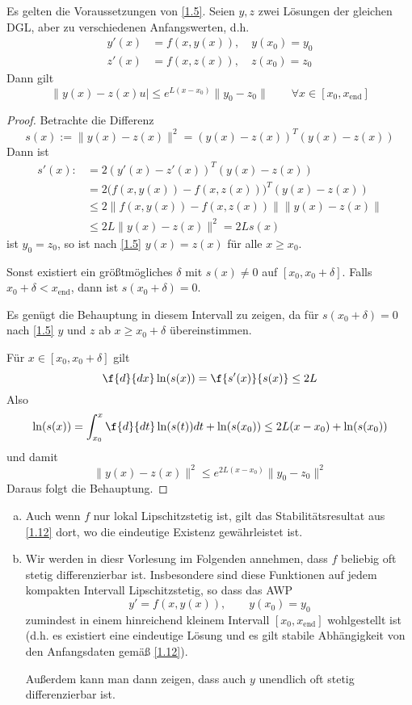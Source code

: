 \documentclass[
]{mycourse}
\begin{document}
\begin{st} \label{1.12}
	Es gelten die Voraussetzungen von \ref{1.5}.
	Seien $y,z$ zwei Lösungen der gleichen DGL, aber zu verschiedenen Anfangswerten, d.h.
	\begin{align*}
		y'(x) &= f(x,y(x)), \quad y(x_0) = y_0 \\
		z'(x) &= f(x,z(x)), \quad z(x_0) = z_0
	\end{align*}
	Dann gilt
	\[
		\|y(x) - z(x)u| \le e^{L(x-x_0)} \|y_0 - z_0\|
		\qquad \forall x \in [x_0,x_{\text{end}}]
	\]
	\begin{proof}
		Betrachte die Differenz
		\[
			s(x) := \|y(x) - z(x)\|^2 = (y(x)-z(x))^T (y(x) - z(x))
		\]
		Dann ist
		\begin{align*}
			s'(x) :&= 2(y'(x)-z'(x))^T (y(x)-z(x)) \\
			&= 2 \Big( f(x,y(x)) - f(x,z(x)) \Big)^T (y(x) -z(x)) \\ 
			&\le 2 \Big\| f(x,y(x)) - f(x, z(x)) \Big\| \| y(x) -z(x)\| \\
			&\le 2 L \|y(x) - z(x) \|^2 
			= 2 Ls(x)
		\end{align*}
		ist $y_0 = z_0$, so ist nach \ref{1.5} $y(x) = z(x)$ für alle $x \ge x_0$.

		Sonst existiert ein größtmögliches $\delta$ mit $s(x) \neq 0$ auf $[x_0,x_0 + \delta]$.
		Falls $x_0 + \delta < x_{\text{end}}$, dann ist $s(x_0 + \delta) = 0$.

		Es genügt die Behauptung in diesem Intervall zu zeigen, da für $s(x_0 + \delta) = 0$ nach \ref{1.5} $y$ und $z$ ab $x \ge x_0 + \delta$ übereinstimmen.

		Für $x \in [x_0, x_0 + \delta]$ gilt
		\[
			\f{d}{dx} \ln (s(x)) = \f {s'(x)}{s(x)} \le 2L
		\]
		Also
		\[
			\ln (s(x))  
			= \int_{x_0}^x \f {d}{dt} \ln(s(t)) dt + \ln(s(x_0))
			\le 2 L (x-x_0) + \ln (s(x_0))
		\]
		und damit
		\[
			\|y(x) - z(x)\|^2 \le e^{2L(x-x_0)} \|y_0-z_0\|^2
		\]
		Daraus folgt die Behauptung.
	\end{proof}
\end{st}


\begin{nt} \label{1.13}
	\begin{enumerate}[a)]
		\item
			Auch wenn $f$ nur lokal Lipschitzstetig ist, gilt das Stabilitätsresultat aus \ref{1.12} dort, wo die eindeutige Existenz gewährleistet ist.
		\item
			Wir werden in diesr Vorlesung im Folgenden annehmen, dass $f$ beliebig oft stetig differenzierbar ist.
			Insbesondere sind diese Funktionen auf jedem kompakten Intervall Lipschitzstetig, so dass das AWP 
			\[
				y'=f(x,y(x)), \qquad y(x_0) = y_0
			\]
			zumindest in einem hinreichend kleinem Intervall $[x_0, x_{\text{end}}]$ wohlgestellt ist (d.h. es existiert eine eindeutige Lösung und es gilt stabile Abhängigkeit von den Anfangsdaten gemäß \ref{1.12}).

			Außerdem kann man dann zeigen, dass auch $y$ unendlich oft stetig differenzierbar ist.
	\end{enumerate}
\end{nt}
\end{document}
